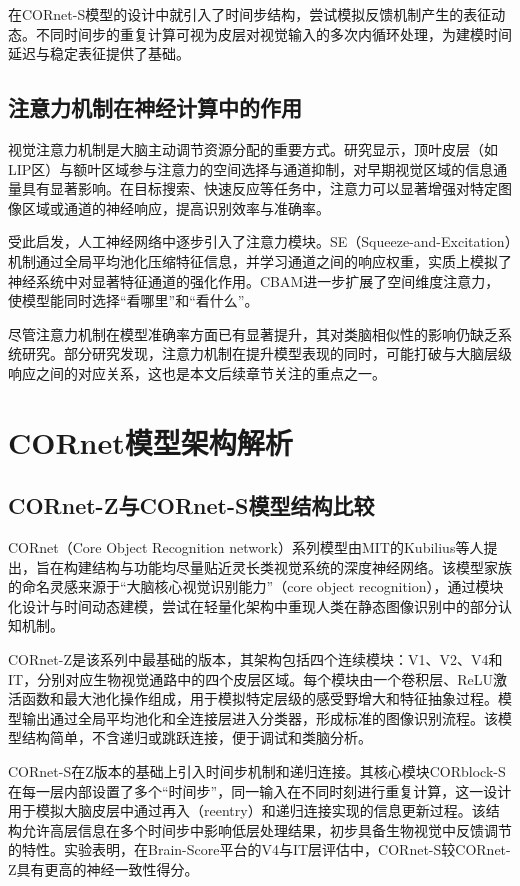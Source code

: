 在CORnet-S模型的设计中就引入了时间步结构，尝试模拟反馈机制产生的表征动态。不同时间步的重复计算可视为皮层对视觉输入的多次内循环处理，为建模时间延迟与稳定表征提供了基础。

\subsection{注意力机制在神经计算中的作用}

视觉注意力机制是大脑主动调节资源分配的重要方式。研究显示，顶叶皮层（如LIP区）与额叶区域参与注意力的空间选择与通道抑制，对早期视觉区域的信息通量具有显著影响。在目标搜索、快速反应等任务中，注意力可以显著增强对特定图像区域或通道的神经响应，提高识别效率与准确率。

受此启发，人工神经网络中逐步引入了注意力模块。SE（Squeeze-and-Excitation）机制通过全局平均池化压缩特征信息，并学习通道之间的响应权重，实质上模拟了神经系统中对显著特征通道的强化作用。CBAM进一步扩展了空间维度注意力，使模型能同时选择“看哪里”和“看什么”。

尽管注意力机制在模型准确率方面已有显著提升，其对类脑相似性的影响仍缺乏系统研究。部分研究发现，注意力机制在提升模型表现的同时，可能打破与大脑层级响应之间的对应关系，这也是本文后续章节关注的重点之一。

\section{CORnet模型架构解析}

\subsection{CORnet-Z与CORnet-S模型结构比较}

CORnet（Core Object Recognition network）系列模型由MIT的Kubilius等人提出，旨在构建结构与功能均尽量贴近灵长类视觉系统的深度神经网络。该模型家族的命名灵感来源于“大脑核心视觉识别能力”（core object recognition），通过模块化设计与时间动态建模，尝试在轻量化架构中重现人类在静态图像识别中的部分认知机制。

CORnet-Z是该系列中最基础的版本，其架构包括四个连续模块：V1、V2、V4和IT，分别对应生物视觉通路中的四个皮层区域。每个模块由一个卷积层、ReLU激活函数和最大池化操作组成，用于模拟特定层级的感受野增大和特征抽象过程。模型输出通过全局平均池化和全连接层进入分类器，形成标准的图像识别流程。该模型结构简单，不含递归或跳跃连接，便于调试和类脑分析。

CORnet-S在Z版本的基础上引入时间步机制和递归连接。其核心模块CORblock-S在每一层内部设置了多个“时间步”，同一输入在不同时刻进行重复计算，这一设计用于模拟大脑皮层中通过再入（reentry）和递归连接实现的信息更新过程。该结构允许高层信息在多个时间步中影响低层处理结果，初步具备生物视觉中反馈调节的特性。实验表明，在Brain-Score平台的V4与IT层评估中，CORnet-S较CORnet-Z具有更高的神经一致性得分。

